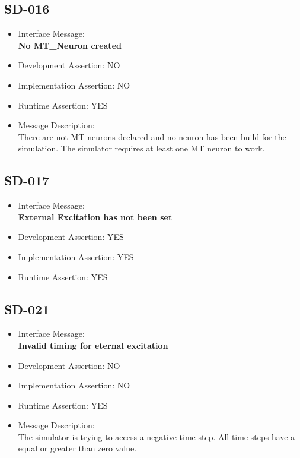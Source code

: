 \subsection{SD-016}
\begin{itemize}
  \item Interface Message:\\[1em]
    \textbf{No MT\_Neuron created}
  \item Development Assertion: NO
  \item Implementation Assertion: NO
  \item Runtime Assertion: YES
  \item Message Description:\\[1em]
    There are not MT neurons declared and no neuron has been build for the simulation. The simulator requires at least one MT neuron to work.
\end{itemize}

\subsection{SD-017}
\begin{itemize}
  \item Interface Message:\\[1em]
    \textbf{External Excitation has not been set}
  \item Development Assertion: YES
  \item Implementation Assertion: YES
  \item Runtime Assertion: YES
\end{itemize}

\subsection{SD-021}
\begin{itemize}
  \item Interface Message:\\[1em]
    \textbf{Invalid timing for eternal excitation}
  \item Development Assertion: NO
  \item Implementation Assertion: NO
  \item Runtime Assertion: YES
  \item Message Description:\\[1em]
    The simulator is trying to access a negative time step. All time steps have a equal or greater than zero value.
\end{itemize}

